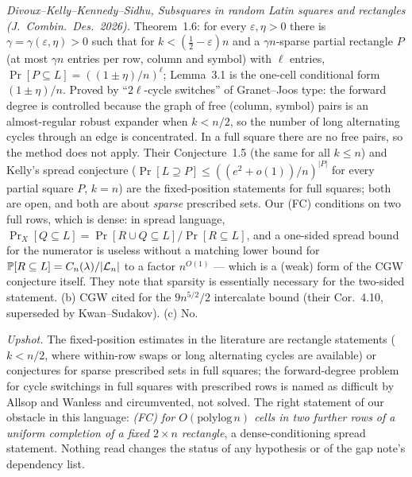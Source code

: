 \emph{Divoux--Kelly--Kennedy--Sidhu, Subsquares in random Latin squares
and rectangles (J.\ Combin.\ Des.\ 2026).}  Theorem~1.6: for every
$\varepsilon,\eta>0$ there is $\gamma=\gamma(\varepsilon,\eta)>0$ such
that for $k<(\tfrac12-\varepsilon)n$ and a $\gamma n$-sparse partial
rectangle $P$ (at most $\gamma n$ entries per row, column and symbol)
with $\ell$ entries, $\Pr[P\subseteq L]=((1\pm\eta)/n)^\ell$; Lemma~3.1
is the one-cell conditional form $(1\pm\eta)/n$.  Proved by
``$2\ell$-cycle switches'' of Granet--Joos type: the forward degree is
controlled because the graph of free (column, symbol) pairs is an
almost-regular robust expander when $k<n/2$, so the number of long
alternating cycles through an edge is concentrated.  In a full square
there are no free pairs, so the method does not apply.  Their
Conjecture~1.5 (the same for all $k\le n$) and Kelly's spread conjecture
($\Pr[L\supseteq P]\le((e^2+o(1))/n)^{|P|}$ for every partial square
$P$, $k=n$) are the fixed-position statements for full squares; both
are open, and both are about \emph{sparse} prescribed sets.  Our (FC)
conditions on two full rows, which is dense: in spread language,
$\Pr_X[Q\subseteq L]=\Pr[R\cup Q\subseteq L]/\Pr[R\subseteq L]$, and a
one-sided spread bound for the numerator is useless without a matching
lower bound for $\mathbb{P}[R\subseteq L]=C_n(\lambda)/|\mathcal L_n|$ to a
factor $n^{O(1)}$ --- which is a (weak) form of the CGW conjecture
itself.  They note that sparsity is essentially necessary for the
two-sided statement.  (b) CGW cited for the $9n^{5/2}/2$ intercalate
bound (their Cor.~4.10, superseded by Kwan--Sudakov).  (c) No.

\emph{Upshot.}  The fixed-position estimates in the literature are
rectangle statements ($k<n/2$, where within-row swaps or long
alternating cycles are available) or conjectures for sparse prescribed
sets in full squares; the forward-degree problem for cycle switchings in
full squares with prescribed rows is named as difficult by Allsop and
Wanless and circumvented, not solved.  The right statement of our
obstacle in this language: \emph{(FC) for $O(\mathrm{polylog}\,n)$ cells
in two further rows of a uniform completion of a fixed $2\times n$
rectangle}, a dense-conditioning spread statement.  Nothing read changes
the status of any hypothesis or of the gap note's dependency list.

